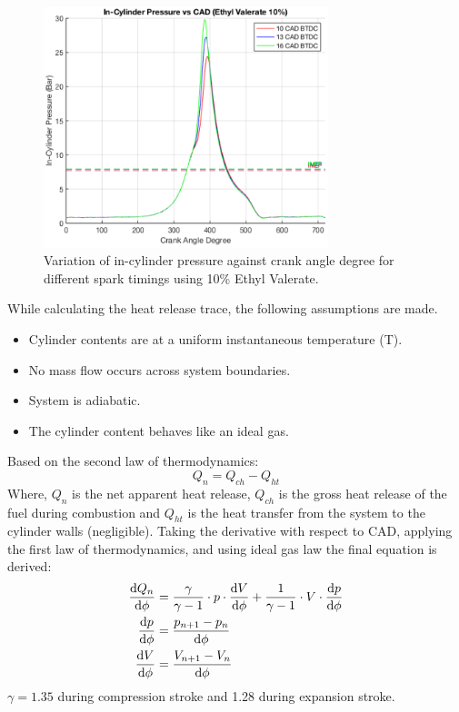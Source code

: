 \documentclass[11pt]{article}
\begin{document}
\begin{figure}[H]
    \centering
    \includegraphics[height = 7cm]{./img/diagram9.png}
    \caption{Variation of in-cylinder pressure against crank angle degree for different spark timings using 10\% Ethyl Valerate.}
    \label{q1-f2}
\end{figure}
While calculating the heat release trace, the following assumptions are made.
\begin{itemize}
    \item Cylinder contents are at a uniform instantaneous temperature (T).
    \item No mass flow occurs across system boundaries.
    \item System is adiabatic.
    \item The cylinder content behaves like an ideal gas.
\end{itemize}
Based on the second law of thermodynamics:
\begin{equation}
    Q_n = Q_{ch} - Q_{ht}
\end{equation}
Where, $Q_n$ is the net apparent heat release, $Q_{ch}$ is the gross heat release of the fuel during combustion and $Q_{ht}$ is the heat transfer from the system to the cylinder walls (negligible). Taking the derivative with respect to CAD, applying the first law of thermodynamics, and using ideal gas law the final equation is derived:
\begin{align}
    \frac{\dif Q_{n}}{\dif \phi} &= \frac{\gamma}{\gamma - 1}\cdot p\cdot \frac{\dif V}{\dif \phi} + \frac{1}{\gamma - 1} \cdot V \cdot \frac{\dif p}{\dif \phi}\\
    \frac{\dif p}{\dif \phi} &= \frac{p_{n+1}-p_n}{\dif \phi}\\
    \frac{\dif V}{\dif \phi} &= \frac{V_{n+1}-V_n}{\dif \phi}
\end{align}
$\gamma = 1.35$ during compression stroke and 1.28 during expansion stroke.
\end{document}
